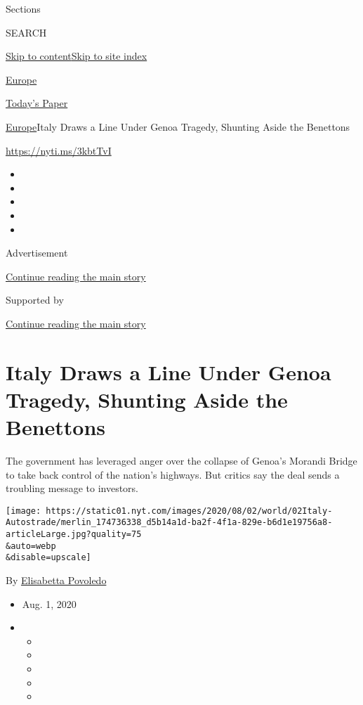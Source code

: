 Sections

SEARCH

\protect\hyperlink{site-content}{Skip to
content}\protect\hyperlink{site-index}{Skip to site index}

\href{https://www.nytimes.com/section/world/europe}{Europe}

\href{https://myaccount.nytimes.com/auth/login?response_type=cookie\&client_id=vi}{}

\href{https://www.nytimes.com/section/todayspaper}{Today's Paper}

\href{/section/world/europe}{Europe}\textbar{}Italy Draws a Line Under
Genoa Tragedy, Shunting Aside the Benettons

\url{https://nyti.ms/3kbtTvI}

\begin{itemize}
\item
\item
\item
\item
\item
\end{itemize}

Advertisement

\protect\hyperlink{after-top}{Continue reading the main story}

Supported by

\protect\hyperlink{after-sponsor}{Continue reading the main story}

\hypertarget{italy-draws-a-line-under-genoa-tragedy-shunting-aside-the-benettons}{%
\section{Italy Draws a Line Under Genoa Tragedy, Shunting Aside the
Benettons}\label{italy-draws-a-line-under-genoa-tragedy-shunting-aside-the-benettons}}

The government has leveraged anger over the collapse of Genoa's Morandi
Bridge to take back control of the nation's highways. But critics say
the deal sends a troubling message to investors.

\texttt{[image: https://static01.nyt.com/images/2020/08/02/world/02Italy-Autostrade/merlin\_174736338\_d5b14a1d-ba2f-4f1a-829e-b6d1e19756a8-articleLarge.jpg?quality=75\\\&auto=webp\\\&disable=upscale]}

By \href{https://www.nytimes.com/by/elisabetta-povoledo}{Elisabetta
Povoledo}

\begin{itemize}
\item
  Aug. 1, 2020
\item
  \begin{itemize}
  \item
  \item
  \item
  \item
  \item
  \end{itemize}
\end{itemize}

